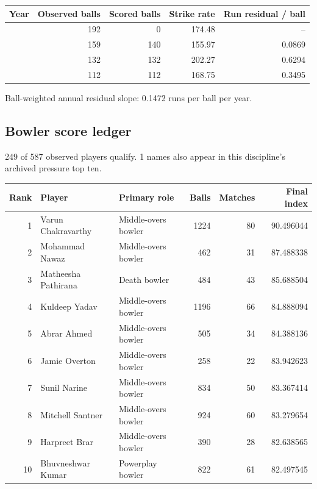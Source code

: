 \begin{center}
\begin{tabularx}{\linewidth}{>{\raggedright\arraybackslash}Xrrrr}
\toprule
Year & Observed balls & Scored balls & Strike rate & Run residual / ball \\
\midrule
2022 & 192 & 0 & 174.48 & -- \\
2023 & 159 & 140 & 155.97 & 0.0869 \\
2024 & 132 & 132 & 202.27 & 0.6294 \\
2025 & 112 & 112 & 168.75 & 0.3495 \\
\bottomrule
\end{tabularx}
\end{center}

Ball-weighted annual residual slope: 0.1472 runs per ball per year.

\clearpage

\subsection{Bowler score ledger}

249 of 587 observed players qualify. 1 names also appear in this discipline's archived pressure top ten.

\begin{center}
\begin{tabularx}{\linewidth}{r>{\raggedright\arraybackslash}X>{\raggedright\arraybackslash}Xrrr}
\toprule
Rank & Player & Primary role & Balls & Matches & Final index \\
\midrule
1 & Varun Chakravarthy & Middle-overs bowler & 1224 & 80 & 90.496044 \\
2 & Mohammad Nawaz & Middle-overs bowler & 462 & 31 & 87.488338 \\
3 & Matheesha Pathirana & Death bowler & 484 & 43 & 85.688504 \\
4 & Kuldeep Yadav & Middle-overs bowler & 1196 & 66 & 84.888094 \\
5 & Abrar Ahmed & Middle-overs bowler & 505 & 34 & 84.388136 \\
6 & Jamie Overton & Middle-overs bowler & 258 & 22 & 83.942623 \\
7 & Sunil Narine & Middle-overs bowler & 834 & 50 & 83.367414 \\
8 & Mitchell Santner & Middle-overs bowler & 924 & 60 & 83.279654 \\
9 & Harpreet Brar & Middle-overs bowler & 390 & 28 & 82.638565 \\
10 & Bhuvneshwar Kumar & Powerplay bowler & 822 & 61 & 82.497545 \\
\bottomrule
\end{tabularx}
\end{center}

